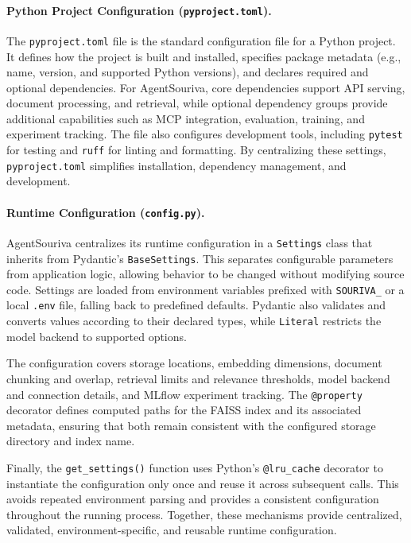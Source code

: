 \paragraph{Python Project Configuration (\texttt{pyproject.toml}).}
The \texttt{pyproject.toml} file is the standard configuration file for a Python project. It defines how the project is built and installed, specifies package metadata (e.g., name, version, and supported Python versions), and declares required and optional dependencies. For AgentSouriva, core dependencies support API serving, document processing, and retrieval, while optional dependency groups provide additional capabilities such as MCP integration, evaluation, training, and experiment tracking. The file also configures development tools, including \texttt{pytest} for testing and \texttt{ruff} for linting and formatting. By centralizing these settings, \texttt{pyproject.toml} simplifies installation, dependency management, and development.

\paragraph{Runtime Configuration (\texttt{config.py}).}
AgentSouriva centralizes its runtime configuration in a
\texttt{Settings} class that inherits from Pydantic's
\texttt{BaseSettings}. This separates configurable parameters
from application logic, allowing behavior to be changed without
modifying source code. Settings are loaded from environment
variables prefixed with \texttt{SOURIVA\_} or a local
\texttt{.env} file, falling back to predefined defaults.
Pydantic also validates and converts values according to their
declared types, while \texttt{Literal} restricts the model
backend to supported options.

The configuration covers storage locations, embedding
dimensions, document chunking and overlap, retrieval limits
and relevance thresholds, model backend and connection details,
and MLflow experiment tracking. The \texttt{@property}
decorator defines computed paths for the FAISS index and its
associated metadata, ensuring that both remain consistent with
the configured storage directory and index name.

Finally, the \texttt{get\_settings()} function uses Python's
\texttt{@lru\_cache} decorator to instantiate the configuration
only once and reuse it across subsequent calls. This avoids
repeated environment parsing and provides a consistent
configuration throughout the running process. Together, these
mechanisms provide centralized, validated, environment-specific,
and reusable runtime configuration.

